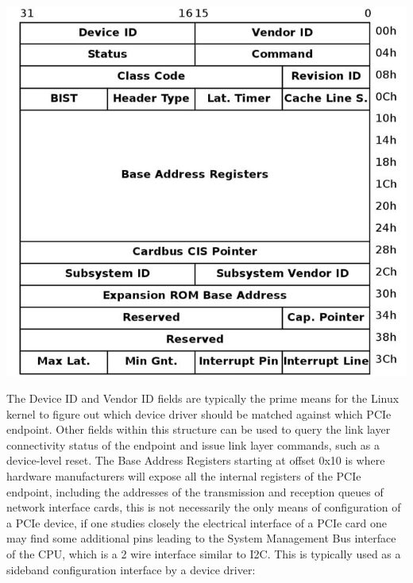 \documentclass[a4paper,12p]{article}
\begin{document}
\includegraphics[width=\textwidth]{pcieconfig}

The Device ID and Vendor ID fields are typically the prime means for the Linux kernel to figure out which device driver should be matched against which PCIe endpoint. Other fields within this structure can be used to query the link layer connectivity status of the endpoint and issue link layer commands, such as a device-level reset. The Base Address Registers starting at offset 0x10 is where hardware manufacturers will expose all the internal registers of the PCIe endpoint, including the addresses of the transmission and reception queues of network interface cards, this is not necessarily the only means of configuration of a PCIe device, if one studies closely the electrical interface of a PCIe card one may find some additional pins leading to the System Management Bus interface of the CPU, which is a 2 wire interface similar to I2C. This is typically used as a sideband configuration interface by a device driver:
\end{document}
